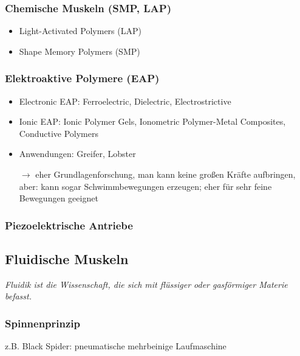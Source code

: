 \subsubsection{Chemische Muskeln (SMP, LAP)}
\begin{itemize}
	\item Light-Activated Polymers (LAP)
	\item Shape Memory Polymers (SMP)
\end{itemize}
\subsubsection{Elektroaktive Polymere (EAP)}
\begin{itemize}
	\item Electronic EAP: Ferroelectric, Dielectric, Electrostrictive
	\item Ionic EAP: Ionic Polymer Gels, Ionometric Polymer-Metal Composites, Conductive Polymers
	\item Anwendungen: Greifer, Lobster
	\item [$\rightarrow$] eher Grundlagenforschung, man kann keine großen Kräfte aufbringen, aber: kann sogar Schwimmbewegungen erzeugen; eher für sehr feine Bewegungen geeignet
\end{itemize}
\subsubsection{Piezoelektrische Antriebe}
\subsection{Fluidische Muskeln}
\emph{Fluidik ist die Wissenschaft, die sich mit flüssiger oder gasförmiger Materie befasst.}
\subsubsection{Spinnenprinzip}
z.B. \glqq Black Spider\grqq : pneumatische mehrbeinige Laufmaschine
